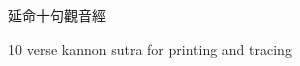 \documentclass[letterpaper]{article}
\begin{document}
	
\centering
	
	\vspace*{3cm}
	
	{
		\fontsize{70}{70}
		延命十句觀音經
	}
	
	\vspace*{1cm}
	
	{
		\Large
		10 verse kannon sutra for printing and tracing	
		
	}
	
\pagebreak

	



%
%
%
\shoutout
\end{document}
